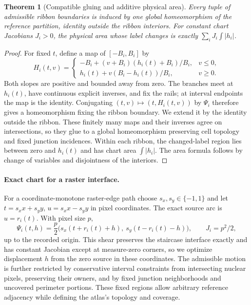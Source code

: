 \documentclass[10pt,letterpaper]{article}
\newtheorem{theorem}{Theorem}
\begin{document}
\begin{samepage}
\begin{theorem}[Compatible gluing and additive physical area]\label{thm:glue}
Every tuple of admissible ribbon boundaries is induced by one global homeomorphism of the reference partition, identity outside the ribbon interiors. For constant chart Jacobians $J_i>0$, the physical area whose label changes is exactly $\sum_i J_i\int|h_i|$.
\end{theorem}
\end{samepage}
\begin{proof}
For fixed $t$, define a map of $[-B_i,B_i]$ by
\begin{equation}
H_i(t,v)=\begin{cases}
-B_i+(v+B_i)(h_i(t)+B_i)/B_i,&v\le0,\\
h_i(t)+v(B_i-h_i(t))/B_i,&v\ge0.
\end{cases}\label{eq:homeo}
\end{equation}
Both slopes are positive and bounded away from zero. The branches meet at $h_i(t)$, have continuous explicit inverses, and fix the rails; at interval endpoints the map is the identity. Conjugating $(t,v)\mapsto(t,H_i(t,v))$ by $\Psi_i$ therefore gives a homeomorphism fixing the ribbon boundary. We extend it by the identity outside the ribbon. These finitely many maps and their inverses agree on intersections, so they glue to a global homeomorphism preserving cell topology and fixed junction incidences. Within each ribbon, the changed-label region lies between zero and $h_i(t)$ and has chart area $\int|h_i|$. The area formula follows by change of variables and disjointness of the interiors.
\end{proof}

\paragraph{Exact chart for a raster interface.}
For a coordinate-monotone raster-edge path choose $s_x,s_y\in\{-1,1\}$ and let $t=s_xx+s_yy$, $u=s_xx-s_yy$ in pixel coordinates. The exact source arc is $u=r_i(t)$. With pixel size $p$,
\begin{equation}
\Psi_i(t,h)=\frac p2\big(s_x(t+r_i(t)+h),\ s_y(t-r_i(t)-h)\big),\qquad J_i=p^2/2,\label{eq:chart}
\end{equation}
up to the recorded origin. This shear preserves the staircase interface exactly and has constant Jacobian except at measure-zero corners, so we optimize displacement $h$ from the zero source in these coordinates. The admissible motion is further restricted by conservative interval constraints from intersecting nuclear pixels, preserving their owners, and by fixed junction neighborhoods and uncovered perimeter portions. These fixed regions allow arbitrary reference adjacency while defining the atlas's topology and coverage.
\end{document}
